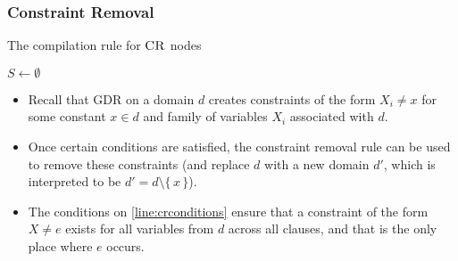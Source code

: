 \subsubsection{Constraint Removal} \label{sec:cr}

\begin{algorithm}
  \caption{The compilation rule for $\operatorname{\textsc{CR}}$ nodes}
  \label{alg:constraintremoval}
  $S \gets \emptyset$\;
\end{algorithm}


\begin{itemize}
\item Recall that GDR on a domain $d$ creates constraints of the form $X_i \ne x$ for some constant $x \in d$ and family of variables $X_i$ associated with $d$.
\item Once certain conditions are satisfied, the constraint removal rule can be used to remove these constraints (and replace $d$ with a new domain $d'$, which is interpreted to be $d' = d \setminus \{\, x \,\}$).
\item The conditions on \cref{line:crconditions} ensure that a constraint of the form $X \ne e$ exists for all variables from $d$ across all clauses, and that is the only place where $e$ occurs.
\end{itemize}

